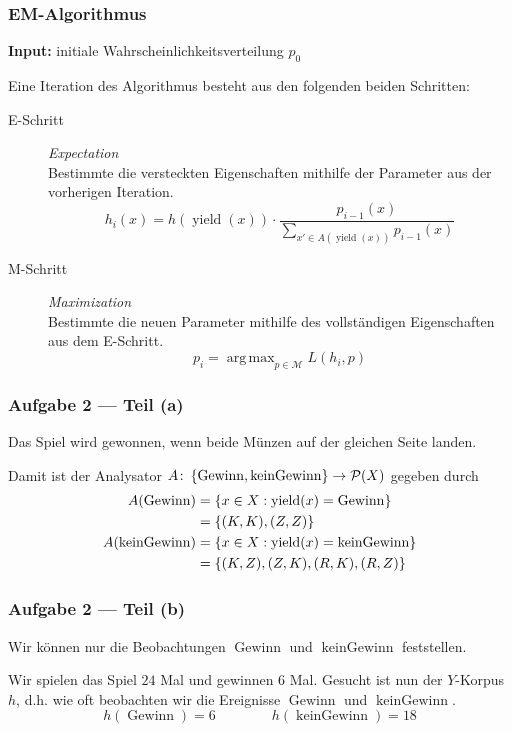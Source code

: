 \documentclass{beamer}
\DeclareMathOperator*{\argmax}{arg\,max}
\DeclareMathOperator{\yield}{yield}
\DeclareMathOperator{\win}{Gewinn}
\DeclareMathOperator{\nowin}{kein Gewinn}
\begin{document}
\begin{frame} \frametitle{EM-Algorithmus}
	\small
	\textbf{Input:} initiale Wahrscheinlichkeitsverteilung $p_0$
	
	Eine Iteration des Algorithmus besteht aus den folgenden beiden Schritten:
	\begin{description}
		\item[E-Schritt] \textit{Expectation} \\
		Bestimmte die versteckten Eigenschaften mithilfe der Parameter aus der vorherigen Iteration.
		\begin{equation*}
			h_i(x) = h(\operatorname{yield}(x)) \cdot \frac{p_{i-1}(x)}{\sum_{x' \in A(\operatorname{yield}(x))} p_{i-1}(x)}
		\end{equation*}
		\item[M-Schritt] \textit{Maximization} \\
		Bestimmte die neuen Parameter mithilfe des vollständigen Eigenschaften aus dem E-Schritt.
		\begin{equation*}
			p_i = \argmax_{p \in \mathcal{M}} L(h_i, p)
		\end{equation*}
	\end{description}
\end{frame}

\begin{frame} \frametitle{Aufgabe 2 --- Teil (a)}
	\justifying \small	
	Das Spiel wird gewonnen, wenn beide Münzen auf der gleichen Seite landen.
	
	\pause
	
	Damit ist der Analysator $A \colon \menge{\win, \nowin} \to \mathcal{P}(X)$ gegeben durch
	\begin{equation*}
		\begin{aligned}
			A(\win) &= \menge{x \in X: \yield(x) = \win} \\
					&= \menge{(K,K), (Z,Z)} \\
			A(\nowin) &= \menge{x \in X: \yield(x) = \nowin} \\
					  &= \menge{(K,Z), (Z,K),(R,K),(R,Z)}
		\end{aligned}
	\end{equation*}
\end{frame}

\begin{frame} \frametitle{Aufgabe 2 --- Teil (b)}
	\justifying \small 
	Wir können nur die Beobachtungen $\win$ und $\nowin$ feststellen. 
	
	Wir spielen das Spiel $24$ Mal und gewinnen $6$ Mal. Gesucht ist nun der $Y$-Korpus $h$, d.h. wie oft beobachten wir die Ereignisse $\win$ und $\nowin$.
	\pause
	\begin{equation*}
		h(\win) = 6 \qquad\qquad h(\nowin) = 18
	\end{equation*}
\end{frame}
\end{document}
